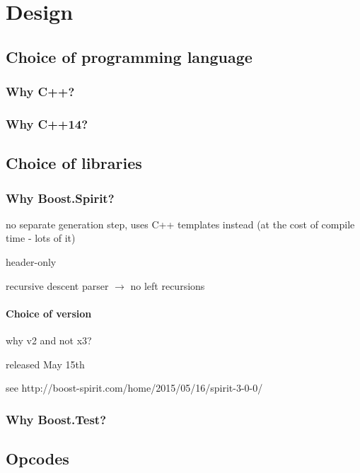 
\chapter{Design} %
    \section{Choice of programming language}
        \subsection{Why C++?}
        \subsection{Why C++14?}
    
    \section{Choice of libraries}
        \subsection{Why Boost.Spirit?}
            no separate generation step, uses C++ templates instead (at the cost of compile time - lots of it)
            
            header-only
            
            recursive descent parser $\rightarrow$ no left recursions
            \subsubsection{Choice of version}
                why v2 and not x3?
                
                released May 15th
                
                see http://boost-spirit.com/home/2015/05/16/spirit-3-0-0/
        \subsection{Why Boost.Test?}
    
    
    \section{Opcodes}
    
